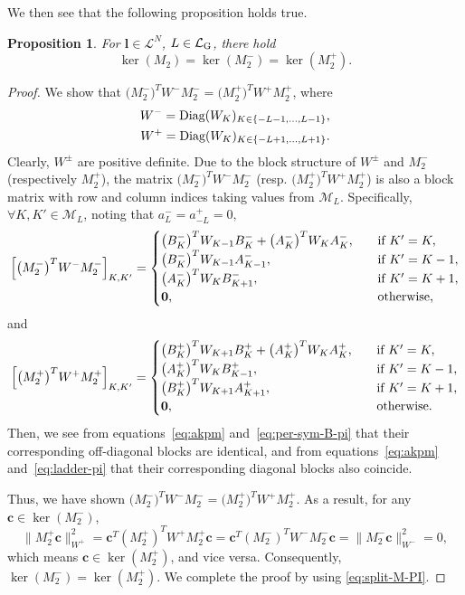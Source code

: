\documentclass{article}
\newtheorem{proposition}[theorem]{Proposition}
\numberwithin{equation}{section}
\def\bc{{\bm c}}
\def\bl{{\bm l}}
\def\calM{\mathcal{M}}
\def\calL{\mathcal{L}}
\def\calLG{\mathcal{\calL_{\rm G}}}
\def\MlL{{M}}
\def\Mp{M^{+}}
\def\Mm{M^{-}}
\def\Ap{A^{+}}
\def\Am{A^{-}}
\def\Bp{B^{+}}
\def\Bm{B^{-}}
\begin{document}
We then see that the following proposition holds true. 
\begin{proposition}
\label{prop:matrix_final_pi}
    For $\bl\in \calL^N$, $L\in \calLG$, there hold
    \[
        \ker(\MlL_{2}) = \ker(\Mm_{2}) = \ker(\Mp_{2}).
    \]
\end{proposition}
\begin{proof}
We show that $\big(\Mm_{2}\big)^TW^-\Mm_{2} = 
    \big(\Mp_{2}\big)^TW^+\Mp_{2}$,
where 
\[
\begin{split}
    W^- = \textup{Diag}(W_K)_{K\in\{-L-1,\ldots,L-1\}}, \\
    W^+ = \textup{Diag}(W_K)_{K\in\{-L+1,\ldots,L+1\}}.
\end{split}
\]
Clearly, $W^\pm$ are positive definite. Due to the block structure of $W^\pm$ and $\Mm_{2}$ (respectively $\Mp_{2}$), the matrix $\big(\Mm_{2}\big)^TW^-\Mm_{2}$ (resp. $\big(\Mp_{2}\big)^TW^+\Mp_{2}$) is also a block matrix with row and column indices taking values from $\calM_L$. Specifically, $\forall K,K'\in\calM_L$, noting that $a^-_{L} = a^+_{-L} =0,$
\[
    \Big[\big(\Mm_{2}\big)^TW^-\Mm_{2}\Big]_{K,K'} = 
    \begin{cases}
        \big(\Bm_K\big)^TW_{K-1}\Bm_K + \big(\Am_K\big)^TW_{K}\Am_K, \quad & \textup{if } K'=K, \\
        \big(\Bm_{K}\big)^TW_{K-1}\Am_{K-1}, \quad & \textup{if } K'=K-1, \\
        \big(\Am_{K}\big)^TW_{K}\Bm_{K+1}, \quad & \textup{if } K'=K+1, \\
        \mathbf{0}, \quad & \textup{otherwise,}
    \end{cases}
\]
and 
\[
    \Big[\big(\Mp_{2}\big)^TW^+\Mp_{2}\Big]_{K,K'} = 
    \begin{cases}
        \big(\Bp_K\big)^TW_{K+1}\Bp_K + \big(\Ap_K\big)^TW_{K}\Ap_K, \quad & \textup{if } K'=K, \\
        \big(\Ap_{K}\big)^TW_{K}\Bp_{K-1}, \quad & \textup{if } K'=K-1, \\
        \big(\Bp_{K}\big)^TW_{K+1}\Ap_{K+1}, \quad & \textup{if } K'=K+1, \\
        \mathbf{0}, \quad & \textup{otherwise.}
    \end{cases}
\]
Then, we see from equations~\eqref{eq:akpm} and~\eqref{eq:per-sym-B-pi} that their corresponding off-diagonal blocks are identical, and from equations~\eqref{eq:akpm} and~\eqref{eq:ladder-pi} that their corresponding diagonal blocks also coincide.

Thus, we have shown
$\big(\Mm_{2}\big)^TW^-\Mm_{2} = \big(\Mp_{2}\big)^TW^+\Mp_{2}$. 
As a result, for any $\bc\in\ker(\Mm_{2})$,
\[
    \|\Mp_{2}\bc\|_{W^+}^2 = \bc^T(\Mp_{2})^TW^+\Mp_{2}\bc=\bc^T(\Mm_{2})^TW^-\Mm_{2}\bc=\|\Mm_{2}\bc\|_{W^-}^2=0,
\]
which means $\bc\in\ker(\Mp_{2})$, and vice versa. Consequently, $\ker(\Mm_{2})=\ker(\Mp_{2})$. We complete the proof by using \eqref{eq:split-M-PI}.
\end{proof}
\end{document}
